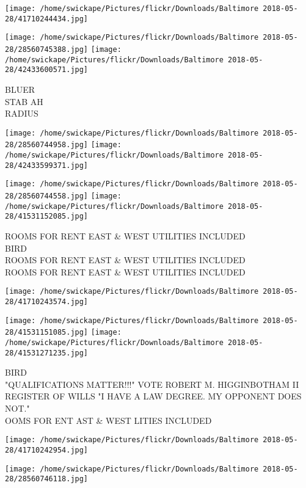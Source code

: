 \documentclass[10pt,letterpaper]{article}
\begin{document}
\texttt{[image: /home/swickape/Pictures/flickr/Downloads/Baltimore 2018-05-28/41710244434.jpg]}

\vspace{0.25in}
\texttt{[image: /home/swickape/Pictures/flickr/Downloads/Baltimore 2018-05-28/28560745388.jpg]}
\texttt{[image: /home/swickape/Pictures/flickr/Downloads/Baltimore 2018-05-28/42433600571.jpg]}

BLUER\\
STAB AH\\
RADIUS
\pagebreak

\texttt{[image: /home/swickape/Pictures/flickr/Downloads/Baltimore 2018-05-28/28560744958.jpg]}
\texttt{[image: /home/swickape/Pictures/flickr/Downloads/Baltimore 2018-05-28/42433599371.jpg]}

\texttt{[image: /home/swickape/Pictures/flickr/Downloads/Baltimore 2018-05-28/28560744558.jpg]}
\texttt{[image: /home/swickape/Pictures/flickr/Downloads/Baltimore 2018-05-28/41531152085.jpg]}

ROOMS FOR RENT EAST \& WEST UTILITIES INCLUDED\\
BIRD\\
ROOMS FOR RENT EAST \& WEST UTILITIES INCLUDED\\
ROOMS FOR RENT EAST \& WEST UTILITIES INCLUDED
\pagebreak

\texttt{[image: /home/swickape/Pictures/flickr/Downloads/Baltimore 2018-05-28/41710243574.jpg]}

\vspace{0.25in}
\texttt{[image: /home/swickape/Pictures/flickr/Downloads/Baltimore 2018-05-28/41531151085.jpg]}
\texttt{[image: /home/swickape/Pictures/flickr/Downloads/Baltimore 2018-05-28/41531271235.jpg]}

BIRD\\
"QUALIFICATIONS MATTER!!!" VOTE ROBERT M. HIGGINBOTHAM II REGISTER OF WILLS "I HAVE A LAW DEGREE.  MY OPPONENT DOES NOT."\\
OOMS FOR ENT AST \& WEST LITIES INCLUDED
\pagebreak

\texttt{[image: /home/swickape/Pictures/flickr/Downloads/Baltimore 2018-05-28/41710242954.jpg]}

\vspace{0.25in}
\texttt{[image: /home/swickape/Pictures/flickr/Downloads/Baltimore 2018-05-28/28560746118.jpg]}
\end{document}
